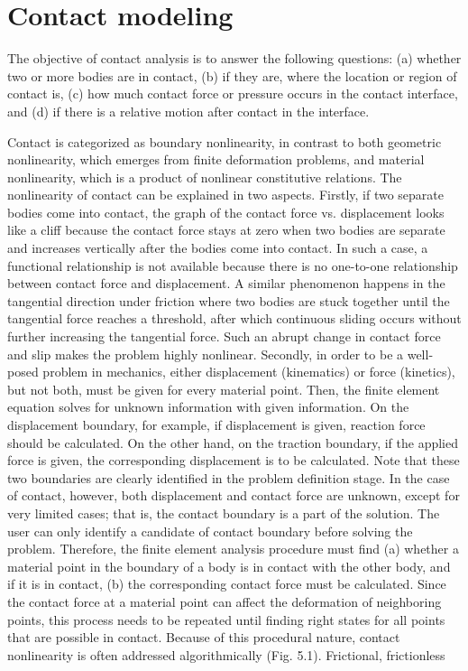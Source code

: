 \section{Contact modeling}
The objective of contact analysis is to answer the following questions:
(a) whether two or more bodies are in contact, (b) if they are, where the location
or region of contact is, (c) how much contact force or pressure occurs in the contact
interface, and (d) if there is a relative motion after contact in the interface.

Contact is categorized as boundary nonlinearity, in contrast to both geometric
nonlinearity, which emerges from finite deformation problems, and material
nonlinearity, which is a product of nonlinear constitutive relations. The nonlinearity
of contact can be explained in two aspects. Firstly, if two separate bodies come into
contact, the graph of the contact force vs. displacement looks like a cliff because the
contact force stays at zero when two bodies are separate and increases vertically
after the bodies come into contact. In such a case, a functional relationship is not
available because there is no one-to-one relationship between contact force and
displacement. A similar phenomenon happens in the tangential direction under
friction where two bodies are stuck together until the tangential force reaches a
threshold, after which continuous sliding occurs without further increasing the
tangential force. Such an abrupt change in contact force and slip makes the problem
highly nonlinear. Secondly, in order to be a well-posed problem in mechanics,
either displacement (kinematics) or force (kinetics), but not both, must be given for
every material point. Then, the finite element equation solves for unknown information
with given information. On the displacement boundary, for example, if
displacement is given, reaction force should be calculated. On the other hand, on
the traction boundary, if the applied force is given, the corresponding displacement
is to be calculated. Note that these two boundaries are clearly identified in the
problem definition stage. In the case of contact, however, both displacement and
contact force are unknown, except for very limited cases; that is, the contact
boundary is a part of the solution. The user can only identify a candidate of contact
boundary before solving the problem. Therefore, the finite element analysis procedure
must find (a) whether a material point in the boundary of a body is in contact
with the other body, and if it is in contact, (b) the corresponding contact force must
be calculated. Since the contact force at a material point can affect the deformation
of neighboring points, this process needs to be repeated until finding right states for
all points that are possible in contact. Because of this procedural nature, contact
nonlinearity is often addressed algorithmically (Fig. 5.1).
Frictional, frictionless 
